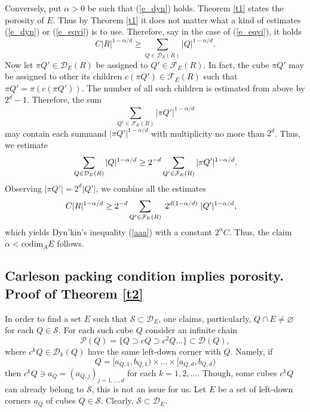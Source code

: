 \documentclass[12pt]{amsart} \setlength{\textwidth}{15cm} \setlength{\textheight}{24cm} \setlength{\voffset}{-1cm} \setlength{\oddsidemargin}{-0.4cm} \setlength{\evensidemargin}{-0.4cm}
\theoremstyle{definition}
\theoremstyle{remark}
\begin{document}
Conversely,   put
$ \alpha >0 $ be such that (\ref{e_dyn})  holds.   Theorem \ref{t1}  states the porosity of  $E$. Thus by Theorem  \ref{t1}  it does not matter what a kind of estimates
 (\ref{e_dyn}) or (\ref{e_eqvi}) is to use.  Therefore, say in the case of (\ref{e_eqvi}), it holds
 \[
   C |R|^{1-\alpha/d}
\geq \sum_{Q \in \mathcal{D}_E(R)}|Q|^{1-\alpha/d}.
\]
 Now let  $\pi Q' \in \mathcal{D}_E(R)$ be assigned to $Q' \in \mathcal{F}_E(R)$.
 In fact, the cube $\pi Q'$  may be assigned to  other its children   $c (\pi Q') \in \mathcal{F}_E(R)$ such that $\pi Q' =\pi (c (\pi Q'))$.
 The number of all such children is estimated from above by  $2^d-1$. Therefore, the sum
 \[\sum_{Q' \in \mathcal{F}_E(R)}|\pi Q'|^{1-\alpha/d}\]
  may contain each summand  $|\pi Q'|^{1-\alpha/d}$  with multiplicity no more than  $2^d$. Thus, we estimate
 \[
   \aligned
  \sum_{Q \in \mathcal{D}_E(R)}|Q|^{1-\alpha/d}
&\geq 2^{-d} \sum_{Q' \in \mathcal{F}_E(R)}|\pi Q'|^{1-\alpha/d}.\\
\endaligned
\]
Observing  $|\pi Q'|= 2^d |Q'|$, we combine all the estimates
\[
   \aligned
C |R|^{1-\alpha/d}
&\geq  2^{-d}\sum_{Q' \in \mathcal{F}_E(R)} \;2^{d(1-\alpha/d)} \;| Q'|^{1-\alpha/d},
\endaligned
\]
which yields     Dyn'kin's inequality (\ref{aaa}) with a constant $ 2^{\alpha} C$. Thus, the claim  $\alpha < \mathrm{codim}_A E$ follows.





\subsection{ Carleson packing condition  implies  porosity. Proof   of Theorem \ref{t2}}

In order to  find a  set $E$ such that   $ \mathcal{S} \subset  \mathcal{D}_E$, one claims,  particularly,
 $Q \cap E \neq \varnothing $ for each $Q \in \mathcal{S}$.
 For each such cube $Q$ consider an infinite chain
\[\mathcal{P}(Q)=\{Q \supset cQ\supset
c^2Q \dots \}\subset \mathcal{D}(Q), \]
 where $c^k Q \in \mathcal{D}_k(Q) $  have the same left-down corner with $Q$. Namely, if
 \[Q= [a_{Q,1}, b_{Q,1}) \times \dots \times [a_{Q,d}, b_{Q,d})\]
  then   $c^k Q \ni a_Q=(a_{Q,j})_{j=1,\dots, d}$ for each $k=1, 2, \dots$. Though, some cubes $c^kQ$ can already belong to $\mathcal{S}$, this is not an issue for us.
 Let $E$ be a set of left-down corners  $a_Q$ of cubes $Q \in \mathcal{S}$. Clearly, $ \mathcal{S} \subset  \mathcal{D}_E$.
\end{document}
